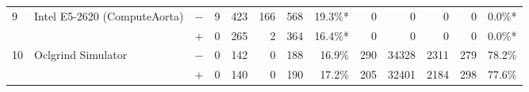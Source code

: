 \begin{tabular}{lll | rrrrr | rrrrr }
\hline
\multirow{ 2}{*}{9} & \multirow{ 2}{*}{Intel E5-2620 (ComputeAorta)} & $-$ & 9 & 423 & 166 & 568 & 19.3\%*       & 0 & 0 & 0 & 0 & 0.0\%* \\& & $+$ & 0 & 265 & 2 & 364 & 16.4\%* & 0 & 0 & 0 & 0 & 0.0\%* \\
\hline
\multirow{ 2}{*}{10} & \multirow{ 2}{*}{Oclgrind Simulator} & $-$ & 0 & 142 & 0 & 188 & 16.9\%       & 290 & 34328 & 2311 & 279 & 78.2\% \\& & $+$ & 0 & 140 & 0 & 190 & 17.2\% & 205 & 32401 & 2184 & 298 & 77.6\% \\
  \bottomrule
\end{tabular}

